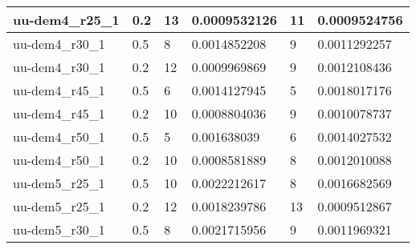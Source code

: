 \begin{table}[]
\begin{tabular}{|l|l|l|l|l|l|}
    uu-dem4\_r25\_1                                & 0.2                                         & 13                             & 0.0009532126                    & 11                             & 0.0009524756                    \\ \hline
    uu-dem4\_r30\_1                                & 0.5                                         & 8                              & 0.0014852208                    & 9                              & 0.0011292257                    \\ \hline
    uu-dem4\_r30\_1                                & 0.2                                         & 12                             & 0.0009969869                    & 9                              & 0.0012108436                    \\ \hline
    uu-dem4\_r45\_1                                & 0.5                                         & 6                              & 0.0014127945                    & 5                              & 0.0018017176                    \\ \hline
    uu-dem4\_r45\_1                                & 0.2                                         & 10                             & 0.0008804036                    & 9                              & 0.0010078737                    \\ \hline
    uu-dem4\_r50\_1                                & 0.5                                         & 5                              & 0.001638039                     & 6                              & 0.0014027532                    \\ \hline
    uu-dem4\_r50\_1                                & 0.2                                         & 10                             & 0.0008581889                    & 8                              & 0.0012010088                    \\ \hline
    uu-dem5\_r25\_1                                & 0.5                                         & 10                             & 0.0022212617                    & 8                              & 0.0016682569                    \\ \hline
    uu-dem5\_r25\_1                                & 0.2                                         & 12                             & 0.0018239786                    & 13                             & 0.0009512867                    \\ \hline
    uu-dem5\_r30\_1                                & 0.5                                         & 8                              & 0.0021715956                    & 9                              & 0.0011969321                    \\ \hline

\end{tabular}
\end{table}
